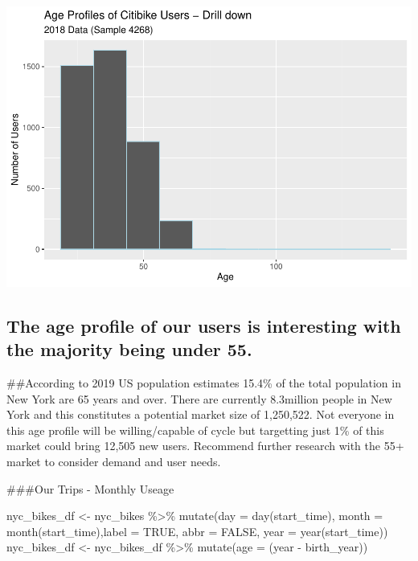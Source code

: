 \documentclass[
]{article}
\newenvironment{Shaded}{\begin{snugshade}}{\end{snugshade}}
\newcommand{\AttributeTok}[1]{\textcolor[rgb]{0.77,0.63,0.00}{#1}}
\newcommand{\ConstantTok}[1]{\textcolor[rgb]{0.00,0.00,0.00}{#1}}
\newcommand{\FunctionTok}[1]{\textcolor[rgb]{0.00,0.00,0.00}{#1}}
\newcommand{\NormalTok}[1]{#1}
\newcommand{\OtherTok}[1]{\textcolor[rgb]{0.56,0.35,0.01}{#1}}
\newcommand{\SpecialCharTok}[1]{\textcolor[rgb]{0.00,0.00,0.00}{#1}}
\begin{document}
\includegraphics{nyc_bikes_presentation_janehogg_files/figure-latex/unnamed-chunk-9-1.pdf}

\hypertarget{the-age-profile-of-our-users-is-interesting-with-the-majority-being-under-55.}{%
\subsection{The age profile of our users is interesting with the
majority being under
55.}\label{the-age-profile-of-our-users-is-interesting-with-the-majority-being-under-55.}}

\#\#According to 2019 US population estimates 15.4\% of the total
population in New York are 65 years and over. There are currently
8.3million people in New York and this constitutes a potential market
size of 1,250,522. Not everyone in this age profile will be
willing/capable of cycle but targetting just 1\% of this market could
bring 12,505 new users. Recommend further research with the 55+ market
to consider demand and user needs.

\#\#\#Our Trips - Monthly Useage

\begin{Shaded}
\begin{Highlighting}[]
\NormalTok{nyc\_bikes\_df }\OtherTok{\textless{}{-}}\NormalTok{ nyc\_bikes }\SpecialCharTok{\%\textgreater{}\%}
  \FunctionTok{mutate}\NormalTok{(}\AttributeTok{day =} \FunctionTok{day}\NormalTok{(start\_time),}
         \AttributeTok{month =} \FunctionTok{month}\NormalTok{(start\_time),}\AttributeTok{label =} \ConstantTok{TRUE}\NormalTok{, }\AttributeTok{abbr =} \ConstantTok{FALSE}\NormalTok{,}
          \AttributeTok{year =} \FunctionTok{year}\NormalTok{(start\_time))}
\NormalTok{nyc\_bikes\_df }\OtherTok{\textless{}{-}}\NormalTok{ nyc\_bikes\_df }\SpecialCharTok{\%\textgreater{}\%}
  \FunctionTok{mutate}\NormalTok{(}\AttributeTok{age =}\NormalTok{ (year }\SpecialCharTok{{-}}\NormalTok{ birth\_year))}
\end{Highlighting}
\end{Shaded}
\end{document}
